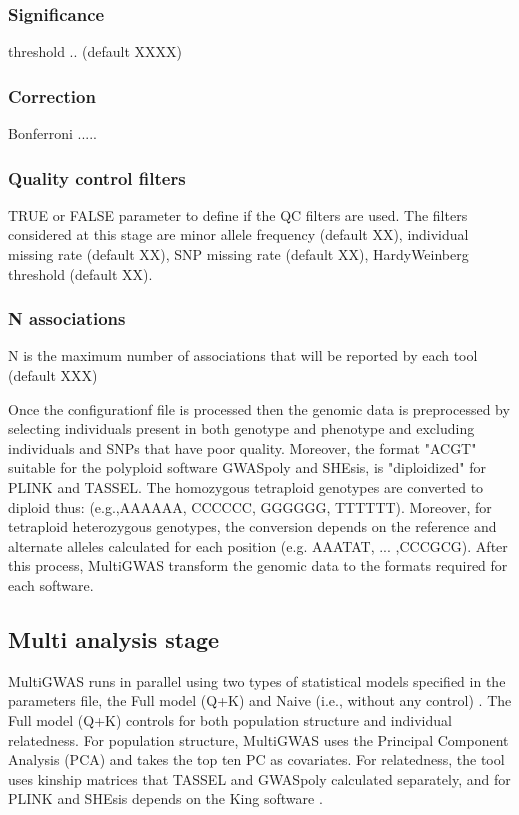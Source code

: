 \documentclass{article}
\begin{document}
\subsubsection{Significance}
threshold .. (default XXXX)

\subsubsection{Correction}
Bonferroni .....

\subsubsection{Quality control filters}
TRUE or FALSE parameter to define if the QC filters are used. The filters considered at this stage are minor allele frequency (default XX), individual missing rate (default XX), SNP missing rate (default XX), Hardy\-Weinberg threshold (default XX).
\subsubsection{N associations}
N is the maximum number of associations that will be reported by each tool (default XXX)


Once the configurationf file is processed then the genomic data is preprocessed by selecting individuals present in both genotype and phenotype and excluding individuals and SNPs that have poor quality. Moreover, the format   "ACGT" suitable for the polyploid software GWASpoly and SHEsis, is "diploidized" for PLINK and TASSEL. The homozygous tetraploid genotypes are converted to diploid thus: (e.g.,AAAA\textrightarrow AA, CCCC\textrightarrow CC, GGGG\textrightarrow GG,
TTTT\textrightarrow TT). Moreover, for tetraploid heterozygous genotypes, the conversion depends on the reference and alternate alleles calculated for each position (e.g. AAAT\textrightarrow AT,
... ,CCCG\textrightarrow CG). After this process, MultiGWAS transform the genomic data to the formats required for each software.


\subsection{Multi analysis stage} 
MultiGWAS runs in parallel using two types of statistical models specified in the parameters file, the Full model (Q+K) and Naive (i.e., without any control) \cite{Sharma2018}. The Full model (Q+K) controls for both population structure and individual relatedness. For population structure, MultiGWAS uses the Principal Component Analysis (PCA) and takes the top ten PC as covariates. For relatedness, the tool uses kinship matrices that TASSEL and GWASpoly calculated separately, and for PLINK and SHEsis depends on the King software \cite{Manichaikul2010}. 
\end{document}
